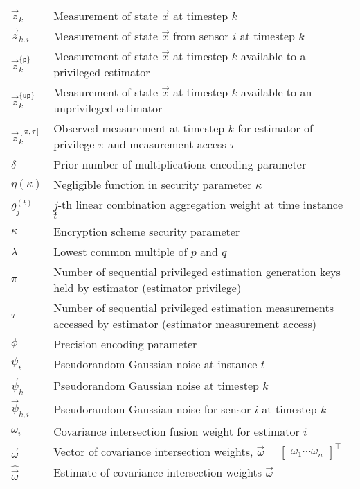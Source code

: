 \documentclass[oneside]{scrbook}
\theoremstyle{definition}
\theoremstyle{definition}
\theoremstyle{remark}
\begin{document}
\begin{longtable}{p{}p{}}
    $\vec{z}_k$ & Measurement of state $\vec{x}$ at timestep $k$\\
    $\vec{z}_{k,i}$ & Measurement of state $\vec{x}$ from sensor $i$ at timestep $k$\\
    $\vec{z}_k^{\{\mathsf{p}\}}$ & Measurement of state $\vec{x}$ at timestep $k$ available to a privileged estimator\\
    $\vec{z}_k^{\{\mathsf{up}\}}$ & Measurement of state $\vec{x}$ at timestep $k$ available to an unprivileged estimator\\
    $\vec{z}^{[\pi,\tau]}_k$ & Observed measurement at timestep $k$ for estimator of privilege $\pi$ and measurement access $\tau$\\
    $\delta$ & Prior number of multiplications encoding parameter\\
    $\eta(\kappa)$ & Negligible function in security parameter $\kappa$\\
    $\theta^{(t)}_j$ & $j$-th linear combination aggregation weight at time instance $t$\\
    $\kappa$ & Encryption scheme security parameter\\
    $\lambda$ & Lowest common multiple of $p$ and $q$\\
    $\pi$ & Number of sequential privileged estimation generation keys held by estimator (estimator privilege)\\
    $\tau$ & Number of sequential privileged estimation measurements accessed by estimator (estimator measurement access)\\
    $\phi$ & Precision encoding parameter\\
    $\psi_t$ & Pseudorandom Gaussian noise at instance $t$\\
    $\vec{\psi}_k$ & Pseudorandom Gaussian noise at timestep $k$\\
    $\vec{\psi}_{k,i}$ & Pseudorandom Gaussian noise for sensor $i$ at timestep $k$\\
    $\omega_i$ & Covariance intersection fusion weight for estimator $i$\\
    $\vec{\omega}$ & Vector of covariance intersection weights, $\vec{\omega}=\begin{bmatrix}\omega_1\cdots\omega_n\end{bmatrix}^\top$\\
    $\hat{\vec{\omega}}$ & Estimate of covariance intersection weights $\vec{\omega}$
\end{longtable}
\end{document}
